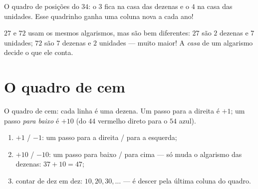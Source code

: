 \begin{omfigure}

{\small O quadro de posições do $34$: o $3$ fica na casa das dezenas
e o $4$ na casa das unidades. Esse quadrinho ganha uma coluna nova a
cada ano!}
\end{omfigure}

\begin{example}\label{ex:g1:tens:place}
$27$ e $72$ usam os mesmos algarismos, mas são bem diferentes: $27$
são $2$ dezenas e $7$ unidades; $72$ são $7$ dezenas e $2$ unidades
--- muito maior! A \emph{casa} de um algarismo decide o que ele
conta.
\end{example}

\section{O quadro de cem}

\begin{omfigure}

{\small O quadro de cem: cada linha é uma dezena. Um passo para a
direita é $+1$; um passo \emph{para baixo} é $+10$ (do $44$ vermelho
direto para o $54$ azul).}
\end{omfigure}

\begin{method}\label{met:g1:tens:grid}
\begin{enumerate}
  \item $+1$ / $-1$: um passo para a direita / para a esquerda;
  \item $+10$ / $-10$: um passo para baixo / para cima --- só muda o
        algarismo das dezenas: $37 + 10 = 47$;
  \item contar de dez em dez: $10, 20, 30, \dots$ --- é descer pela
        última coluna do quadro.
\end{enumerate}
\end{method}

